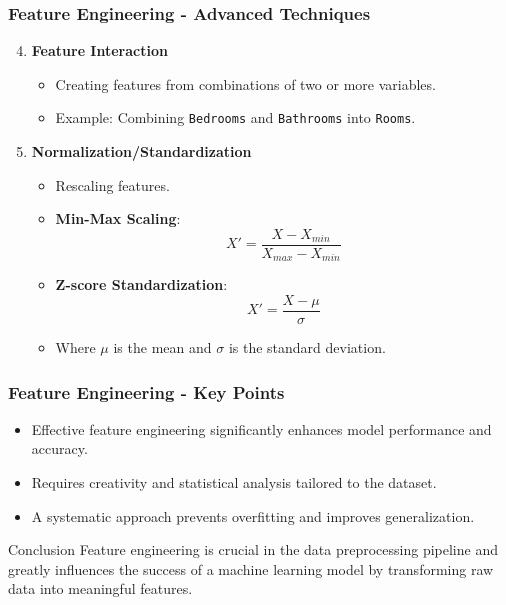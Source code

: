 \documentclass[aspectratio=169]{beamer}
\begin{document}
\begin{frame}[fragile]
    \frametitle{Feature Engineering - Advanced Techniques}
    \begin{enumerate}
        \setcounter{enumi}{3}
        \item \textbf{Feature Interaction}
            \begin{itemize}
                \item Creating features from combinations of two or more variables.
                \item Example: Combining \texttt{Bedrooms} and \texttt{Bathrooms} into \texttt{Rooms}.
            \end{itemize}

        \item \textbf{Normalization/Standardization}
            \begin{itemize}
                \item Rescaling features.
                \item \textbf{Min-Max Scaling}: \[
                X' = \frac{X - X_{min}}{X_{max} - X_{min}}
                \]
                \item \textbf{Z-score Standardization}: \[
                X' = \frac{X - \mu}{\sigma}
                \]
                \item Where \( \mu \) is the mean and \( \sigma \) is the standard deviation.
            \end{itemize}
    \end{enumerate}
\end{frame}

\begin{frame}[fragile]
    \frametitle{Feature Engineering - Key Points}
    \begin{itemize}
        \item Effective feature engineering significantly enhances model performance and accuracy.
        \item Requires creativity and statistical analysis tailored to the dataset.
        \item A systematic approach prevents overfitting and improves generalization.
    \end{itemize}
    \begin{block}{Conclusion}
        Feature engineering is crucial in the data preprocessing pipeline and greatly influences the success of a machine learning model by transforming raw data into meaningful features.
    \end{block}
\end{frame}
\end{document}
